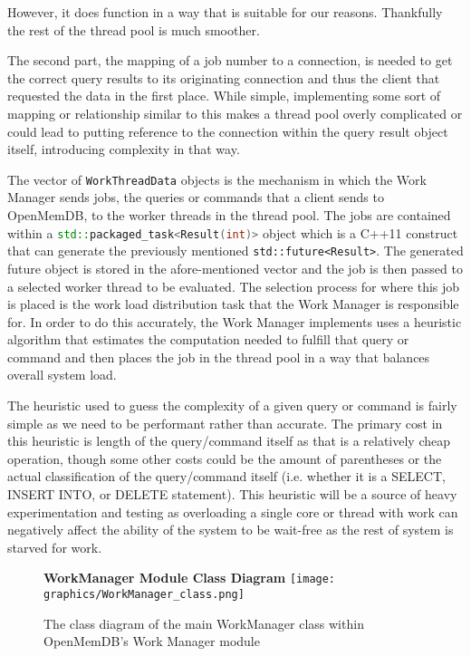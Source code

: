 \documentclass[letterpaper, 12pt]{article}
\begin{document}
  However, it does function in a way that is suitable for our reasons. Thankfully the rest of the thread
  pool is much smoother.
  \par\vspace{\baselineskip}
  The second part, the mapping of a job number to a connection, is needed to get the correct query results
  to its originating connection and thus the client that requested the data in the first place. While simple,
  implementing some sort of mapping or relationship similar to this makes a thread pool overly complicated
  or could lead to putting reference to the connection within the query result object itself, introducing
  complexity in that way.
  \par\vspace{\baselineskip}
  The vector of \lstinline[]|WorkThreadData| objects is the mechanism in
  which the Work Manager sends jobs, the queries or commands that a client sends to OpenMemDB, to the
  worker threads in the thread pool. The jobs are contained within a \lstinline[language=C++]|std::packaged_task<Result(int)>|
  object which is a C++11 construct that can generate the previously mentioned \lstinline|std::future<Result>|.
  The generated future object is stored in the afore-mentioned vector and the job is then passed to a selected
  worker thread to be evaluated. The selection process for where this job is placed is the work load distribution
  task that the Work Manager is responsible for. In order to do this accurately, the Work Manager implements
  uses a heuristic algorithm that estimates the computation needed to fulfill that query or command
  and then places the job in the thread pool in a way that balances overall system load.
  \par\vspace{\baselineskip}
  The heuristic used to guess the complexity of a given query or command is fairly simple as we need to
  be performant rather than accurate. The primary cost in this heuristic is length of the query/command itself
  as that is a relatively cheap operation, though some other costs could be the amount of parentheses
  or the actual classification of the query/command itself (i.e. whether it is a SELECT, INSERT INTO, or DELETE statement).
  This heuristic will be a source of heavy experimentation and testing as overloading a single core or thread
  with work can negatively affect the ability of the system to be wait-free as the rest of system is
  starved for work.
  \par\vspace{\baselineskip}
  \begin{figure}
   \centering
   \textbf{WorkManager Module Class Diagram}
   \texttt{[image: graphics/WorkManager\_class.png]}
   \caption{The class diagram of the main WorkManager class within OpenMemDB's Work Manager module}
  \end{figure}
\end{document}
